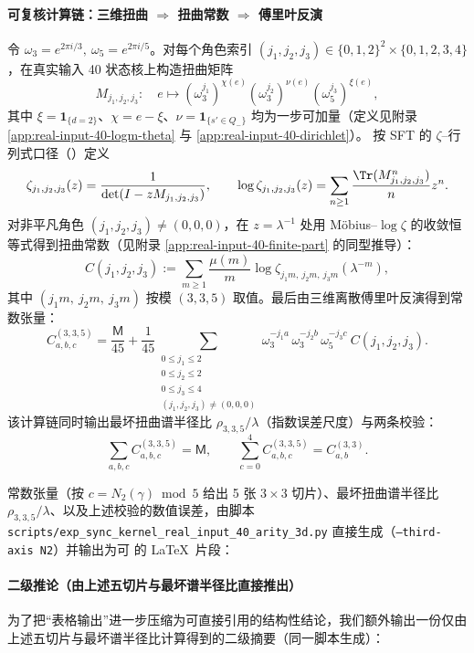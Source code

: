 \paragraph{可复核计算链：三维扭曲 $\Rightarrow$ 扭曲常数 $\Rightarrow$ 傅里叶反演}
令 $\omega_3=e^{2\pi i/3},\ \omega_5=e^{2\pi i/5}$。对每个角色索引 $(j_1,j_2,j_3)\in\{0,1,2\}^2\times\{0,1,2,3,4\}$，在真实输入 40 状态核上构造扭曲矩阵
$$
M_{j_1,j_2,j_3}:\quad
e\mapsto (\omega_3^{j_1})^{\chi(e)}(\omega_3^{j_2})^{\nu(e)}(\omega_5^{j_3})^{\xi(e)},
$$
其中 $\xi=\mathbf{1}_{\{d=2\}}$、$\chi=e-\xi$、$\nu=\mathbf{1}_{\{s'\in Q_-\}}$ 均为一步可加量（定义见附录 \ref{app:real-input-40-logm-theta} 与 \ref{app:real-input-40-dirichlet}）。
按 SFT 的 $\zeta$--行列式口径（\cite{BrinStuck2002}）定义
$$
\zeta_{j_1,j_2,j_3}(z)=\frac{1}{\det(I-zM_{j_1,j_2,j_3})},
\qquad
\log\zeta_{j_1,j_2,j_3}(z)=\sum_{n\ge 1}\frac{\Tr(M_{j_1,j_2,j_3}^n)}{n}z^n.
$$
对非平凡角色 $(j_1,j_2,j_3)\neq(0,0,0)$，在 $z=\lambda^{-1}$ 处用 Möbius--$\log\zeta$ 的收敛恒等式得到扭曲常数（见附录 \ref{app:real-input-40-finite-part} 的同型推导）：
$$
C(j_1,j_2,j_3):=\sum_{m\ge 1}\frac{\mu(m)}{m}\log\zeta_{j_1m,\ j_2m,\ j_3m}(\lambda^{-m}),
$$
其中 $(j_1m,\ j_2m,\ j_3m)$ 按模 $(3,3,5)$ 取值。最后由三维离散傅里叶反演得到常数张量：
$$
C^{(3,3,5)}_{a,b,c}
=\frac{\mathsf{M}}{45}
+\frac{1}{45}\!\!\!\sum_{\substack{0\le j_1\le 2\\0\le j_2\le 2\\0\le j_3\le 4\\(j_1,j_2,j_3)\ne(0,0,0)}}
\omega_3^{-j_1 a}\,\omega_3^{-j_2 b}\,\omega_5^{-j_3 c}\ C(j_1,j_2,j_3).
$$
该计算链同时输出最坏扭曲谱半径比 $\rho_{3,3,5}/\lambda$（指数误差尺度）与两条校验：
$$
\sum_{a,b,c}C^{(3,3,5)}_{a,b,c}=\mathsf{M},
\qquad
\sum_{c=0}^{4}C^{(3,3,5)}_{a,b,c}=C^{(3,3)}_{a,b}.
$$

常数张量（按 $c=N_2(\gamma)\bmod 5$ 给出 5 张 $3\times 3$ 切片）、最坏扭曲谱半径比 $\rho_{3,3,5}/\lambda$、以及上述校验的数值误差，由脚本
\texttt{scripts/exp\_sync\_kernel\_real\_input\_40\_arity\_3d.py}
直接生成（\texttt{--third-axis N2}）并输出为可 \verb|| 的 \LaTeX\ 片段：


\paragraph{二级推论（由上述五切片与最坏谱半径比直接推出）}
为了把“表格输出”进一步压缩为可直接引用的结构性结论，我们额外输出一份仅由上述五切片与最坏谱半径比计算得到的二级摘要（同一脚本生成）：


